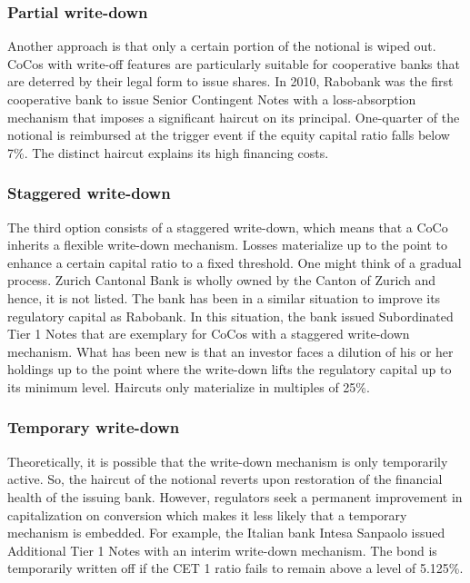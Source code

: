 \subsubsection*{Partial write-down}
Another approach is that only a certain portion of the notional is wiped out. CoCos with write-off features are particularly suitable for cooperative banks that are deterred by their legal form to issue shares. \citep{de2014handbook} In 2010, Rabobank was the first cooperative bank to issue Senior Contingent Notes with a loss-absorption mechanism that imposes a significant haircut on its principal. One-quarter of the notional is reimbursed at the trigger event if the equity capital ratio falls below 7\%. The distinct haircut explains its high financing costs. 
\citep{rabobank2010}

\subsubsection*{Staggered write-down}
The third option consists of a staggered write-down, which means that a CoCo inherits a flexible write-down mechanism. Losses materialize up to the point to enhance a certain capital ratio to a fixed threshold. One might think of a gradual process. \citep{de2014handbook} Zurich Cantonal Bank is wholly owned by the Canton of Zurich and hence, it is not listed. The bank has been in a similar situation to improve its regulatory capital as Rabobank. In this situation, the bank issued Subordinated Tier 1 Notes that are exemplary for CoCos with a staggered write-down mechanism. What has been new is that an investor faces a dilution of his or her holdings up to the point where the write-down lifts the regulatory capital up to its minimum level. Haircuts only materialize in multiples of 25\%. \citep{zkv2013}

\subsubsection*{Temporary write-down}
Theoretically, it is possible that the write-down mechanism is only temporarily active. So, the haircut of the notional reverts upon restoration of the financial health of the issuing bank. However, regulators seek a permanent improvement in capitalization on conversion which makes it less likely that a temporary mechanism is embedded. \citep{avdjiev2013cocos} For example, the Italian bank Intesa Sanpaolo issued Additional Tier 1 Notes with an interim write-down mechanism. The bond is temporarily written off if the CET 1 ratio fails to remain above a level of 5.125\%. \citep{intesa2016temporary}

